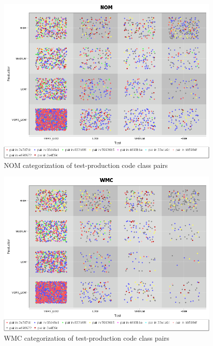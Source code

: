 \begin{figure}
    \centering
    \includegraphics[width=\linewidth]{resources/NOM.png}
    \caption{NOM categorization of test-production code class pairs}
    \label{figure:loc}
\end{figure}
\begin{figure}
    \centering
    \includegraphics[width=\linewidth]{resources/WMC.png}
    \caption{WMC categorization of test-production code class pairs}
    \label{subfigure:loc}
\end{figure}


